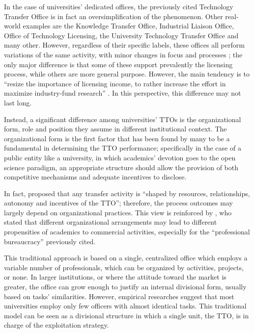 In the case of universities' dedicated offices, the previously cited Technology Transfer Office is in fact an oversimplification of the phenomenon. Other real-world examples are the Knowledge Transfer Office, Industrial Liaison Office, Office of Technology Licensing, the University Technology Transfer Office and many other. However, regardless of their specific labels, these offices all perform variations of the same activity, with minor changes in focus and processes \citep{Brescia2016}; the only major difference is that some of these support prevalently the licensing process, while others are more general purpose. However, the main tendency is to \enquote{resize the importance of licensing income, to rather increase the effort in maximize industry-fund research} \citep{Balderi2010}. In this perspective, this difference may not last long. 

Instead, a significant difference among universities' TTOs is the organizational form, role and position they assume in different institutional context. The organizational form is the first factor that has been found by many to be a fundamental in determining the TTO performance; specifically in the case of a public entity like a university, in which academics' devotion goes to the open science paradigm, an appropriate structure should allow the provision of both competitive mechanisms and adequate incentives to disclose. 

In fact, \citet{Bercovitz2001} proposed that any transfer activity is \enquote{shaped by resources, relationships, autonomy and incentives of the TTO}; therefore, the process outcomes may largely depend on organizational practices. This view is reinforced by \citet{Debackere2005}, who stated that different organizational arrangements may lead to different propensities of academics to commercial activities, especially for the \enquote{professional bureaucracy} previously cited. 

This traditional approach is based on a single, centralized office which employs a variable number of professionals, which can be organized by activities, projects, or none. In larger institutions, or where the attitude toward the market is greater, the office can grow enough to justify an internal divisional form, usually based on tasks' similarities. However, empirical researches suggest that most universities employ only few officers with almost identical tasks. This traditional model can be seen as a divisional structure in which a single unit, the TTO, is in charge of the exploitation strategy. 

